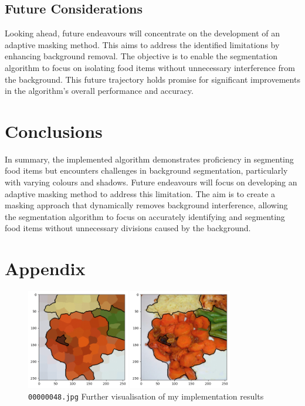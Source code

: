 \documentclass[conference]{IEEEtran}
\begin{document}
 	\subsection{Future Considerations}
 	
 	Looking ahead, future endeavours will concentrate on the development of an adaptive masking method. This aims to address the identified limitations by enhancing background removal. The objective is to enable the segmentation algorithm to focus on isolating food items without unnecessary interference from the background. This future trajectory holds promise for significant improvements in the algorithm's overall performance and accuracy.
 	
 	\section{Conclusions}
 	
	In summary, the implemented algorithm demonstrates proficiency in segmenting food items but encounters challenges in background segmentation, particularly with varying colours and shadows. Future endeavours will focus on developing an adaptive masking method to address this limitation. The aim is to create a masking approach that dynamically removes background interference, allowing the segmentation algorithm to focus on accurately identifying and segmenting food items without unnecessary divisions caused by the background.


	
	
	
	\newpage
	
	\section*{Appendix}
	
	 \begin{figure}[htbp]
		\centerline{\includegraphics[width = 0.4\textwidth]{slic.png}}
		\centerline{\includegraphics[width = 0.4\textwidth]{sliconreal.png}}
		\caption{\texttt{00000048.jpg} Further visualisation of my implementation results}
		\label{fig:extra_vis}
	\end{figure}
	
\end{document}
